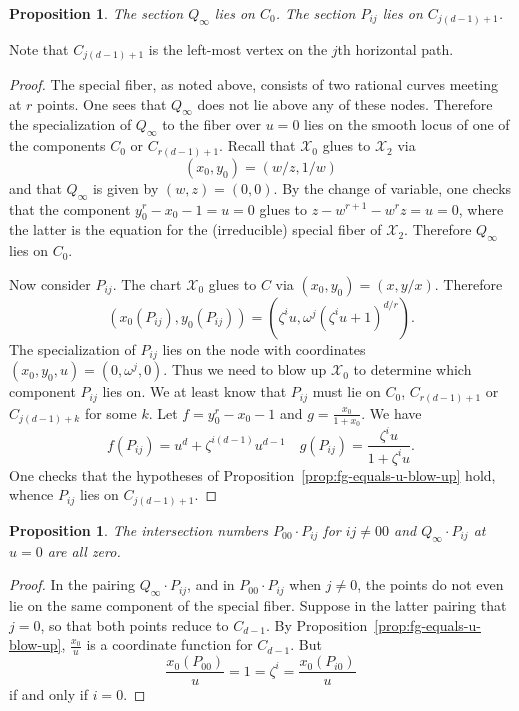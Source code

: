 \documentclass[reqno]{amsart}
\newtheorem{proposition}[thm]{Proposition}
\theoremstyle{definition}
\theoremstyle{remark}
\def\XX{\mathcal{X}}
\begin{document}
\begin{proposition}
  The section $Q_\infty$ lies on $C_0$. The section $P_{ij}$ lies on $C_{j(d-1)+1}$.
\end{proposition}

Note that $C_{j(d-1)+1}$ is the left-most vertex on the $j$th horizontal path.

\begin{proof}
   The special fiber, as noted above, consists of two rational curves meeting at $r$ points. One sees that $Q_\infty$ does not lie above any of these nodes. Therefore the specialization of $Q_\infty$ to the fiber over $u = 0$ lies on the smooth locus of one of the components $C_0$ or $C_{r(d-1)+1}$. Recall that $\XX_0$ glues to $\XX_2$ via
  \[
  (x_0, y_0) = (w/z, 1/w)
  \]
  and that $Q_\infty$ is given by $(w, z) = (0, 0)$. By the change of variable, one checks that the component $y_0^r - x_0 - 1 = u = 0$ glues to $z - w^{r+1} - w^rz = u = 0$, where the latter is the equation for the (irreducible) special fiber of $\XX_2$. Therefore $Q_\infty$ lies on $C_0$.

  Now consider $P_{ij}$. The chart $\XX_0$ glues to $C$ via $(x_0, y_0) = (x, y/x)$. Therefore
  \[
  (x_0(P_{ij}), y_0(P_{ij})) = (\zeta^i u, \omega^j(\zeta^iu + 1)^{d/r}).
  \]
  The specialization of $P_{ij}$ lies on the node with coordinates $(x_0, y_0, u) = (0, \omega^j, 0)$. Thus we need to blow up $\XX_0$ to determine which component $P_{ij}$ lies on. We at least know that $P_{ij}$ must lie on $C_0$, $C_{r(d-1)+1}$ or $C_{j(d-1) + k}$ for some $k$. Let $f = y_0^r - x_0 - 1$ and $g = \frac{x_0}{1+x_0}$. We have
  \[
  f(P_{ij}) = u^d + \zeta^{i(d-1)} u^{d-1} \quad g(P_{ij}) = \frac{\zeta^i u}{1 + \zeta^i u}.
  \]
  One checks that the hypotheses of Proposition~\ref{prop:fg-equals-u-blow-up} hold, whence $P_{ij}$ lies on $C_{j(d-1)+1}$.
\end{proof}

\begin{proposition}\label{prop:local-intersections-u-0}
  The intersection numbers $P_{00} \cdot P_{ij}$ for $ij \neq 00$ and $Q_{\infty} \cdot P_{ij}$ at $u = 0$ are all zero.
\end{proposition}

\begin{proof}
  In the pairing $Q_\infty \cdot P_{ij}$, and in $P_{00} \cdot P_{ij}$ when $j \neq 0$, the points do not even lie on the same component of the special fiber. Suppose in the latter pairing that $j = 0$, so that both points reduce to $C_{d-1}$. By Proposition~\ref{prop:fg-equals-u-blow-up}, $\frac{x_0}{u}$ is a coordinate function for $C_{d-1}$. But
  \[
  \frac{x_0(P_{00})}{u} = 1 = \zeta^i = \frac{x_0(P_{i0})}{u}
  \]
  if and only if $i = 0$.
\end{proof}
\end{document}
